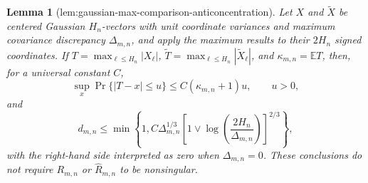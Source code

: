 \documentclass{article}
\newtheorem{lemma}{Lemma}
\begin{document}
\begin{lemma}[lem:gaussian-max-comparison-anticoncentration]\label{lem:gaussian-max-comparison-anticoncentration}
Let \(X\) and \(\widetilde X\) be centered Gaussian \(H_n\)-vectors with unit coordinate variances and maximum covariance discrepancy \(\Delta_{m,n}\), and apply the maximum results to their \(2H_n\) signed coordinates.  If \(T=\max_{\ell\le H_n}|X_\ell|\), \(\widetilde T=\max_{\ell\le H_n}|\widetilde X_\ell|\), and \(\kappa_{m,n}=\mathbb E T\), then, for a universal constant \(C\),
\[
 \sup_x\Pr\{|T-x|\le u\}\le C(\kappa_{m,n}+1)u,\qquad u>0,
\]
and
\[
 d_{m,n}\le
 \min\!\left\{1,C\Delta_{m,n}^{1/3}
 \left[1\vee\log\!\left(\frac{2H_n}{\Delta_{m,n}}\right)\right]^{2/3}\right\},
\]
with the right-hand side interpreted as zero when \(\Delta_{m,n}=0\).  These conclusions do not require \(R_{m,n}\) or \(\widehat R_{m,n}\) to be nonsingular.
\end{lemma}
\end{document}
